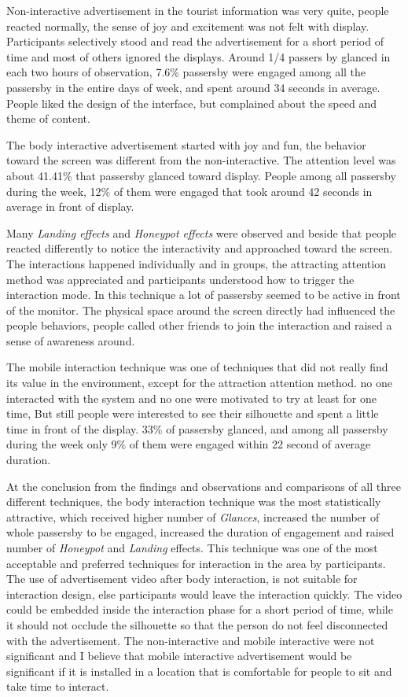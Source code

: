 Non-interactive advertisement in the tourist information was very quite, people reacted normally, the sense of joy and excitement was not felt with display. Participants selectively stood and read the advertisement for a short period of time and most of others ignored the displays. Around 1/4 passers by glanced in each two hours of observation, 7.6\% passersby were engaged among all the passersby in the entire days of week, and spent around 34 seconds in average. People liked the design of the interface, but complained about the speed and theme of content.

The body interactive advertisement started with joy and fun, the behavior toward the screen was different from the non-interactive. The attention level was about 41.41\% that passersby glanced toward display. People among all passersby during the week, 12\% of them were engaged that took around 42 seconds in average in front of display.

Many \emph{Landing effects} and \emph{Honeypot effects} were observed and beside that people reacted differently to notice the interactivity and approached toward the screen. The interactions happened individually and in groups, the attracting attention method was appreciated and participants understood how to trigger the interaction mode. In this technique a lot of passersby seemed to be active in front of the monitor. The physical space around the screen directly had influenced the people behaviors, people called other friends to join the interaction and raised a sense of awareness around. 

The mobile interaction technique was one of techniques that did not really find its value in the environment, except for the attraction attention method. no one interacted with the system and no one were motivated to try at least for one time, But still people were interested to see their silhouette and spent a little time in front of the display. 33\% of passersby glanced, and among all passersby during the week only 9\% of them were engaged within 22 second of average duration.

At the conclusion from the findings and observations and comparisons of all three different techniques, the body interaction technique was the most statistically attractive, which received higher number of \emph{Glances}, increased the number of whole passersby to be engaged, increased the duration of engagement and raised number of \emph{Honeypot} and \emph{Landing} effects. This technique was one of the most acceptable and preferred techniques for interaction in the area by participants. The use of advertisement video after body interaction, is not suitable for interaction design, else participants would leave the interaction quickly. The video could be embedded inside the interaction phase for a short period of time, while it should not occlude the silhouette so that the person do not feel disconnected with the advertisement. The non-interactive and mobile interactive were not significant and I believe that mobile interactive advertisement would be significant if it is installed in a location that is comfortable for people to sit and take time to interact.
